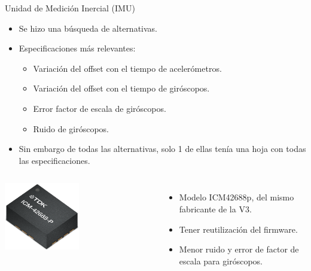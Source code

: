 \begin{frame}{Unidad de Medición Inercial (IMU)}
	\begin{itemize}
		\item Se hizo una búsqueda de alternativas.
		\item Especificaciones más relevantes:
		\begin{itemize}
			\item Variación del offset con el tiempo de acelerómetros.
			\item Variación del offset con el tiempo de giróscopos.
			\item Error factor de escala de giróscopos.
			\item Ruido de giróscopos.
		\end{itemize}
		\item Sin embargo de todas las alternativas, solo 1 de ellas tenía una hoja con todas las especificaciones.
	\end{itemize}
	\begin{columns}
			\begin{center}
				\includegraphics[width=0.5\textwidth]{img/icm42688p.png}
			\end{center}
			\begin{itemize}
			 	\item Modelo ICM42688p, del mismo fabricante de la V3.
				\item Tener reutilización del firmware.
		 		\item Menor ruido y error de factor de escala para giróscopos.
			\end{itemize}
	\end{columns}
\end{frame}



